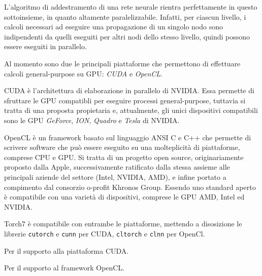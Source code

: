 L'algoritmo di addestramento di una rete neurale rientra perfettamente in questo
sottoinsieme, in quanto altamente paralelizzabile. Infatti, per ciascun livello,
i calcoli necessari ad eseguire una propagazione di un singolo nodo sono indipendenti
da quelli eseguiti per altri nodi dello stesso livello, quindi possono essere
eseguiti in parallelo.

Al momento sono due le principali piattaforme che permettono di effettuare calcoli
general-purpose su GPU: \emph{CUDA} e \emph{OpenCL}.

CUDA \`e l'architettura di elaborazione in parallelo di NVIDIA.
Essa permette di sfruttare le GPU compatibli per eseguire processi general-purpose,
tuttavia si tratta di una proposta propietaria e, attualmente, gli unici dispositivi
compatibili sono le GPU \emph{GeForce}, \emph{ION}, \emph{Quadro} e \emph{Tesla}
di NVIDIA.

OpenCL \`e un framework basato sul linguaggio ANSI C e C++ che permette di scrivere
software che pu\`o essere eseguito su una molteplicit\`a di piattaforme, comprese
CPU e GPU. Si tratta di un progetto open source, originariamente proposto dalla
Apple, successivamente ratificato dalla stessa assieme alle principali aziende
del settore (Intel, NVIDIA, AMD), e infine portato a compimento dal consorzio
o-profit Khronos Group. Essendo uno standard aperto \`e compatibile con una
variet\`a di dispositivi, comprese le GPU AMD, Intel ed NVIDIA.

Torch7 \`e compatibile con entrambe le piattaforme, mettendo a disosizione le
librerie \texttt{cutorch} e \texttt{cunn} per CUDA, \texttt{cltorch} e \texttt{clnn}
per OpenCl.



Per il supporto alla piattaforma CUDA.



Per il supporto al framework OpenCL.
